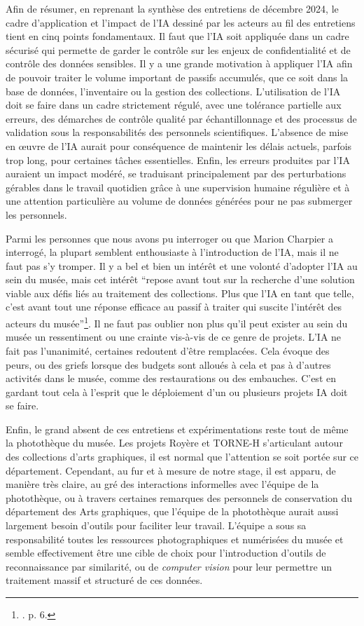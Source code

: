 Afin de résumer, en reprenant la synthèse des entretiens de décembre 2024, le cadre d'application et l'impact de l'IA dessiné par les acteurs au fil des entretiens tient en cinq points fondamentaux. Il faut que l'IA soit appliquée dans un cadre sécurisé qui permette de garder le contrôle sur les enjeux de confidentialité et de contrôle des données sensibles. Il y a une grande motivation à appliquer l'IA afin de pouvoir traiter le volume important de passifs accumulés, que ce soit dans la base de données, l'inventaire ou la gestion des collections. L'utilisation de l'IA doit se faire dans un cadre strictement régulé, avec une tolérance partielle aux erreurs, des démarches de contrôle qualité par échantillonnage et des processus de validation sous la responsabilités des personnels scientifiques. L'absence de mise en œuvre de l'IA aurait pour conséquence de maintenir les délais actuels, parfois trop long, pour certaines tâches essentielles. Enfin, les erreurs produites par l'IA auraient un impact modéré, se traduisant principalement par des perturbations gérables dans le travail quotidien grâce à une supervision humaine régulière et à une attention particulière au volume de données générées pour ne pas submerger les personnels.

Parmi les personnes que nous avons pu interroger ou que Marion Charpier a interrogé, la plupart semblent enthousiaste à l'introduction de l'IA, mais il ne faut pas s'y tromper. Il y a bel et bien un intérêt et une volonté d'adopter l'IA au sein du musée, mais cet intérêt \enquote{repose avant tout sur la recherche d'une solution viable aux défis liés au traitement des collections. Plus que l'IA en tant que telle, c'est avant tout une réponse efficace au passif à traiter qui suscite l'intérêt des acteurs du musée}\footnote{\cite{bermes_repenser_2025}. p. 6.}. Il ne faut pas oublier non plus qu'il peut exister au sein du musée un ressentiment ou une crainte vis-à-vis de ce genre de projets. L'IA ne fait pas l'unanimité, certain\wokisme e\wokisme s redoutent d'être remplacé\wokisme e\wokisme s. Cela évoque des peurs, ou des griefs lorsque des budgets sont alloués à cela et pas à d'autres activités dans le musée, comme des restaurations ou des embauches. C'est en gardant tout cela à l'esprit que le déploiement d'un ou plusieurs projets IA doit se faire. 

Enfin, le grand absent de ces entretiens et expérimentations reste tout de même la photothèque du musée. Les projets Royère et TORNE-H s'articulant autour des collections d'arts graphiques, il est normal que l'attention se soit portée sur ce département. Cependant, au fur et à mesure de notre stage, il est apparu, de manière très claire, au gré des interactions informelles avec l'équipe de la photothèque, ou à travers certaines remarques des personnels de conservation du département des Arts graphiques, que l'équipe de la photothèque aurait aussi largement besoin d'outils pour faciliter leur travail. L'équipe a sous sa responsabilité toutes les ressources photographiques et numérisées du musée et semble effectivement être une cible de choix pour l'introduction d'outils de reconnaissance par similarité, ou de \textit{computer vision} pour leur permettre un traitement massif et structuré de ces données. 

